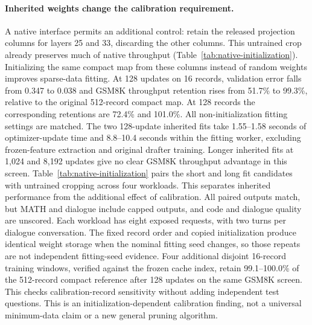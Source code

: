 \paragraph{Inherited weights change the calibration requirement.}
A native interface permits an additional control: retain the released
projection columns for layers 25 and 33, discarding the other columns.
This untrained crop already preserves much of native throughput
(Table~\ref{tab:native-initialization}). Initializing the same compact map
from these columns instead of random weights improves sparse-data fitting.
At 128 updates on 16 records, validation error falls from 0.347 to 0.038
and GSM8K throughput retention rises from 51.7\% to 99.3\%, relative to
the original 512-record compact map. At 128 records the corresponding
retentions are 72.4\% and 101.0\%. All non-initialization fitting settings
are matched. The two 128-update inherited fits take 1.55--1.58 seconds
of optimizer-update time and 8.8--10.4 seconds within the fitting worker,
excluding frozen-feature extraction and original drafter training. Longer inherited fits at 1,024 and 8,192 updates give no
clear GSM8K throughput advantage in this screen.
Table~\ref{tab:native-initialization} pairs the short and long fit candidates
with untrained cropping across four workloads. This separates inherited
performance from the additional effect of calibration. All paired outputs
match, but MATH and dialogue include capped outputs, and code and dialogue
quality are unscored. Each workload has eight exposed requests, with two
turns per dialogue conversation. The fixed record order and copied
initialization produce identical weight storage when the nominal fitting
seed changes, so those repeats are not independent fitting-seed evidence.
Four additional disjoint 16-record training windows, verified against
the frozen cache index, retain 99.1--100.0\% of the 512-record compact
reference after 128 updates on the same GSM8K screen. This checks
calibration-record sensitivity without adding independent test questions.
This is an initialization-dependent calibration finding, not a universal
minimum-data claim or a new general pruning algorithm.
